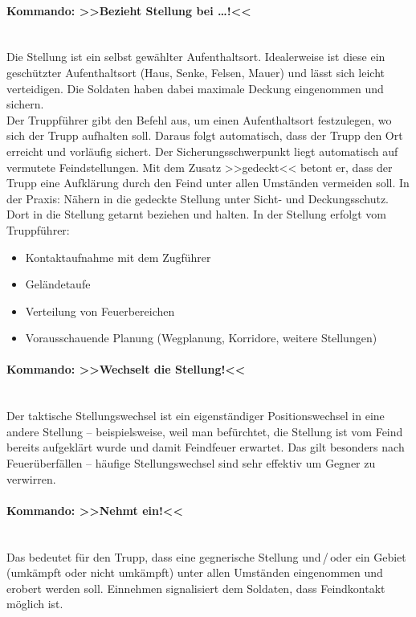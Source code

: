 \paragraph*{Kommando: >>Bezieht Stellung bei \dots!<<}\hfil\\
	Die Stellung ist ein selbst gewählter Aufenthaltsort. Idealerweise ist diese ein geschützter Aufenthaltsort (Haus, Senke, Felsen, Mauer) und lässt sich leicht verteidigen. Die Soldaten haben dabei maximale Deckung eingenommen und sichern.\\
	Der Truppführer gibt den Befehl aus, um einen Aufenthaltsort festzulegen, wo sich der Trupp aufhalten soll. Daraus folgt automatisch, dass der Trupp den Ort erreicht und vorläufig sichert. Der Sicherungsschwerpunkt liegt automatisch auf vermutete Feindstellungen. Mit dem Zusatz >>gedeckt<< betont er, dass der Trupp eine Aufklärung durch den Feind unter allen Umständen vermeiden soll. In der Praxis: Nähern in die gedeckte Stellung unter Sicht- und Deckungsschutz. Dort in die Stellung getarnt beziehen und halten. In der Stellung erfolgt vom Truppführer:
		\begin{itemize}
			\item Kontaktaufnahme mit dem Zugführer 
			\item Geländetaufe 
			\item Verteilung von Feuerbereichen 
			\item Vorausschauende Planung (Wegplanung, Korridore, weitere Stellungen) 
		\end{itemize}

\paragraph*{Kommando: >>Wechselt die Stellung!<<}\hfil\\
	Der taktische Stellungswechsel ist ein eigenständiger Positionswechsel in eine andere Stellung – beispielsweise, weil man befürchtet, die Stellung ist vom Feind bereits aufgeklärt wurde und damit Feindfeuer erwartet. Das gilt besonders nach Feuerüberfällen – häufige Stellungswechsel sind sehr effektiv um Gegner zu verwirren.

\paragraph*{Kommando: >>Nehmt ein!<<}\hfil\\
	Das bedeutet für den Trupp, dass eine gegnerische Stellung und\,/\,oder ein Gebiet (umkämpft oder nicht umkämpft) unter allen Umständen eingenommen und erobert werden soll. Einnehmen signalisiert dem Soldaten, dass Feindkontakt möglich ist.

